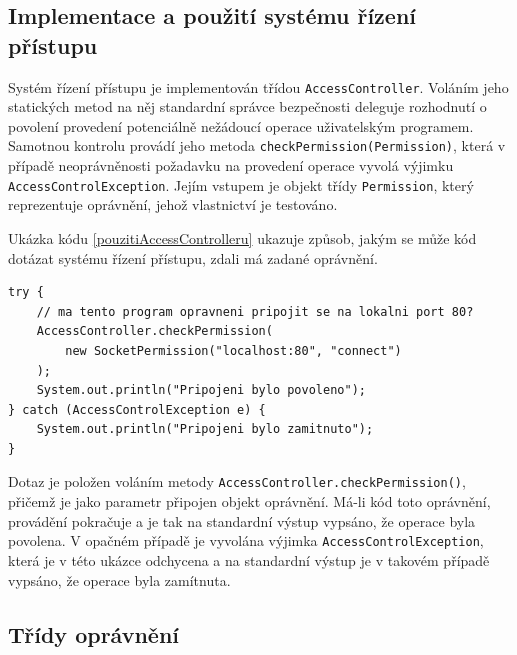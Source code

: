 \subsection{Implementace a použití systému řízení přístupu}\label{implementaceAC}

Systém řízení přístupu je implementován třídou {\tt AccessController}. Voláním jeho statických metod na něj standardní správce bezpečnosti deleguje rozhodnutí o povolení provedení potenciálně nežádoucí operace uživatelským programem. Samotnou kontrolu provádí jeho metoda {\tt checkPermission(Permission)}, která v případě neoprávněnosti požadavku na provedení operace vyvolá výjimku {\tt AccessControlException}. Jejím vstupem je objekt třídy {\tt Permission}, který reprezentuje oprávnění, jehož vlastnictví je testováno. \cite[5.5]{oaks}\cite[6]{oaks}

Ukázka kódu \ref{pouzitiAccessControlleru} ukazuje způsob, jakým se může kód dotázat systému řízení přístupu, zdali má zadané oprávnění. \cite[5.5]{oaks}

\begin{lstlisting}[caption=Příklad položení dotazu systému řízení přístupu, label=pouzitiAccessControlleru]
try {
    // ma tento program opravneni pripojit se na lokalni port 80?
    AccessController.checkPermission(
        new SocketPermission("localhost:80", "connect")
    );
    System.out.println("Pripojeni bylo povoleno");
} catch (AccessControlException e) {
    System.out.println("Pripojeni bylo zamitnuto");
}
\end{lstlisting}

Dotaz je položen voláním metody {\tt AccessController.checkPermission()}, přičemž je jako parametr připojen objekt oprávnění.
Má-li kód toto oprávnění, provádění pokračuje a je tak na standardní výstup vypsáno, že operace byla povolena.
V opačném případě je vyvolána výjimka {\tt AccessControlException}, která je v této ukázce odchycena a na standardní výstup je v takovém případě vypsáno, že operace byla zamítnuta.

\subsection{Třídy oprávnění}

